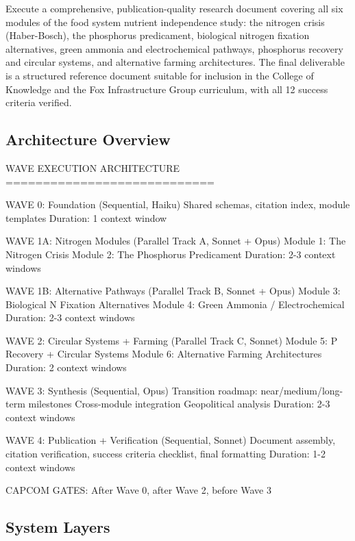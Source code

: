 \documentclass[11pt,letterpaper]{article}
\begin{document}
Execute a comprehensive, publication-quality research document covering all six modules of the food system nutrient independence study: the nitrogen crisis (Haber-Bosch), the phosphorus predicament, biological nitrogen fixation alternatives, green ammonia and electrochemical pathways, phosphorus recovery and circular systems, and alternative farming architectures. The final deliverable is a structured reference document suitable for inclusion in the College of Knowledge and the Fox Infrastructure Group curriculum, with all 12 success criteria verified.

\subsection{Architecture Overview}

\begin{asciibox}
WAVE EXECUTION ARCHITECTURE
============================

WAVE 0: Foundation (Sequential, Haiku)
  Shared schemas, citation index, module templates
  Duration: 1 context window

WAVE 1A: Nitrogen Modules (Parallel Track A, Sonnet + Opus)
  Module 1: The Nitrogen Crisis
  Module 2: The Phosphorus Predicament
  Duration: 2-3 context windows

WAVE 1B: Alternative Pathways (Parallel Track B, Sonnet + Opus)
  Module 3: Biological N Fixation Alternatives
  Module 4: Green Ammonia / Electrochemical
  Duration: 2-3 context windows

WAVE 2: Circular Systems + Farming (Parallel Track C, Sonnet)
  Module 5: P Recovery + Circular Systems
  Module 6: Alternative Farming Architectures
  Duration: 2 context windows

WAVE 3: Synthesis (Sequential, Opus)
  Transition roadmap: near/medium/long-term milestones
  Cross-module integration
  Geopolitical analysis
  Duration: 2-3 context windows

WAVE 4: Publication + Verification (Sequential, Sonnet)
  Document assembly, citation verification,
  success criteria checklist, final formatting
  Duration: 1-2 context windows

CAPCOM GATES: After Wave 0, after Wave 2, before Wave 3
\end{asciibox}

\subsection{System Layers}
\end{document}
